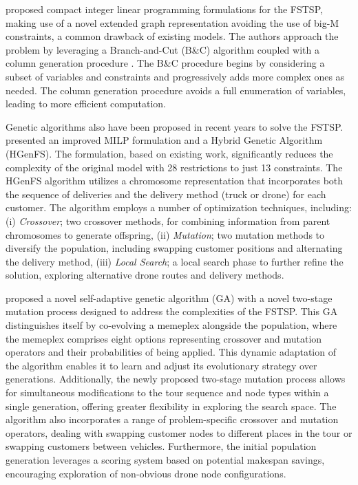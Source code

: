 \documentclass{article}
\begin{document}
	\par
	\citeauthor{Boccia2021} \cite{Boccia2021} proposed compact integer linear programming formulations for the FSTSP, making use of a novel extended graph representation avoiding the use of big-M constraints, a common drawback of existing models. The authors approach the problem by leveraging a Branch-and-Cut (B\&C) algorithm coupled with a column generation procedure \cite{ColumnRow1960}. The B\&C procedure begins by considering a subset of variables and constraints and progressively adds more complex ones as needed. The column generation procedure avoids a full enumeration of variables, leading to more efficient computation.
	\par
	Genetic algorithms also have been proposed in recent years to solve the FSTSP. \citeauthor{Kuroswiski2023} \cite{Kuroswiski2023} presented an improved MILP formulation and a Hybrid Genetic Algorithm (HGenFS). The formulation, based on existing work, significantly reduces the complexity of the original model with 28 restrictions to just 13 constraints.
 	The HGenFS algorithm utilizes a chromosome representation that incorporates both the sequence of deliveries and the delivery method (truck or drone) for each customer. The algorithm employs a number of optimization techniques, including:  (i) \textit{Crossover}; two crossover methods, for combining information from parent chromosomes to generate offspring, (ii) \textit{Mutation}; two mutation methods to diversify the population, including swapping customer positions and alternating the delivery method, (iii) \textit{Local Search}; a local search phase to further refine the solution, exploring alternative drone routes and delivery methods.
	\par
	\citeauthor{Pilcher2023} \cite{Pilcher2023} proposed a novel self-adaptive genetic algorithm (GA) with a novel two-stage mutation process designed to address the complexities of the FSTSP. This GA distinguishes itself by co-evolving a memeplex alongside the population, where the memeplex comprises eight options representing crossover and mutation operators and their probabilities of being applied. This dynamic adaptation of the algorithm enables it to learn and adjust its evolutionary strategy over generations. Additionally, the newly proposed two-stage mutation process allows for simultaneous modifications to the tour sequence and node types within a single generation, offering greater flexibility in exploring the search space. The algorithm also incorporates a range of problem-specific crossover and mutation operators, dealing with swapping customer nodes to different places in the tour or swapping customers between vehicles. Furthermore, the initial population generation leverages a scoring system based on potential makespan savings, encouraging exploration of non-obvious drone node configurations.
	
\end{document}
